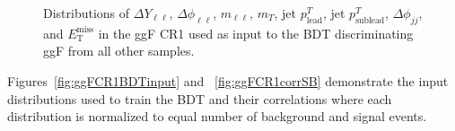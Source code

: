 \begin{figure}[!h]
{  }\hfill
  \hfill
{\caption{Distributions of $\Delta Y_{\ell\ell}$, $\Delta \phi_{\ell\ell}$, $m_{\ell\ell}$, $m_T$, jet $p^T_{\text{lead}}$, jet $p^T_{\text{sublead}}$, $\Delta \phi_{jj}$, and $\ensuremath{E_{\text{T}}^{\text{miss}}}$ in the ggF CR1 used as input to the BDT discriminating ggF from all other samples.
\label{fig:ggFCR1}}}
\end{figure} 

Figures~\ref{fig:ggFCR1BDTinput} and ~\ref{fig:ggFCR1corrSB} demonstrate the input distributions used to train the BDT and their correlations where each distribution is normalized to equal number of background and signal events. 

